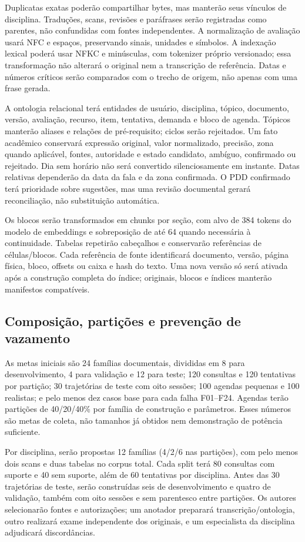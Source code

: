 \documentclass[12pt]{article}
\begin{document}
Duplicatas exatas poderão compartilhar bytes, mas manterão seus vínculos de disciplina. Traduções, scans, revisões e paráfrases serão registradas como parentes, não confundidas com fontes independentes. A normalização de avaliação usará NFC e espaços, preservando sinais, unidades e símbolos. A indexação lexical poderá usar NFKC e minúsculas, com tokenizer próprio versionado; essa transformação não alterará o original nem a transcrição de referência. Datas e números críticos serão comparados com o trecho de origem, não apenas com uma frase gerada.

A ontologia relacional terá entidades de usuário, disciplina, tópico, documento, versão, avaliação, recurso, item, tentativa, demanda e bloco de agenda. Tópicos manterão aliases e relações de pré-requisito; ciclos serão rejeitados. Um fato acadêmico conservará expressão original, valor normalizado, precisão, zona quando aplicável, fontes, autoridade e estado candidato, ambíguo, confirmado ou rejeitado. Dia sem horário não será convertido silenciosamente em instante. Datas relativas dependerão da data da fala e da zona confirmada. O PDD confirmado terá prioridade sobre sugestões, mas uma revisão documental gerará reconciliação, não substituição automática.

Os blocos serão transformados em chunks por seção, com alvo de 384 tokens do modelo de embeddings e sobreposição de até 64 quando necessária à continuidade. Tabelas repetirão cabeçalhos e conservarão referências de células/blocos. Cada referência de fonte identificará documento, versão, página física, bloco, offsets ou caixa e hash do texto. Uma nova versão só será ativada após a construção completa do índice; originais, blocos e índices manterão manifestos compatíveis.

\subsection{Composição, partições e prevenção de vazamento}

As metas iniciais são 24 famílias documentais, divididas em 8 para desenvolvimento, 4 para validação e 12 para teste; 120 consultas e 120 tentativas por partição; 30 trajetórias de teste com oito sessões; 100 agendas pequenas e 100 realistas; e pelo menos dez casos base para cada falha F01--F24. Agendas terão partições de 40/20/40\% por família de construção e parâmetros. Esses números são metas de coleta, não tamanhos já obtidos nem demonstração de potência suficiente.

Por disciplina, serão propostas 12 famílias (4/2/6 nas partições), com pelo menos dois scans e duas tabelas no corpus total. Cada split terá 80 consultas com suporte e 40 sem suporte, além de 60 tentativas por disciplina. Antes das 30 trajetórias de teste, serão construídas seis de desenvolvimento e quatro de validação, também com oito sessões e sem parentesco entre partições. Os autores selecionarão fontes e autorizações; um anotador preparará transcrição/ontologia, outro realizará exame independente dos originais, e um especialista da disciplina adjudicará discordâncias.
\end{document}
